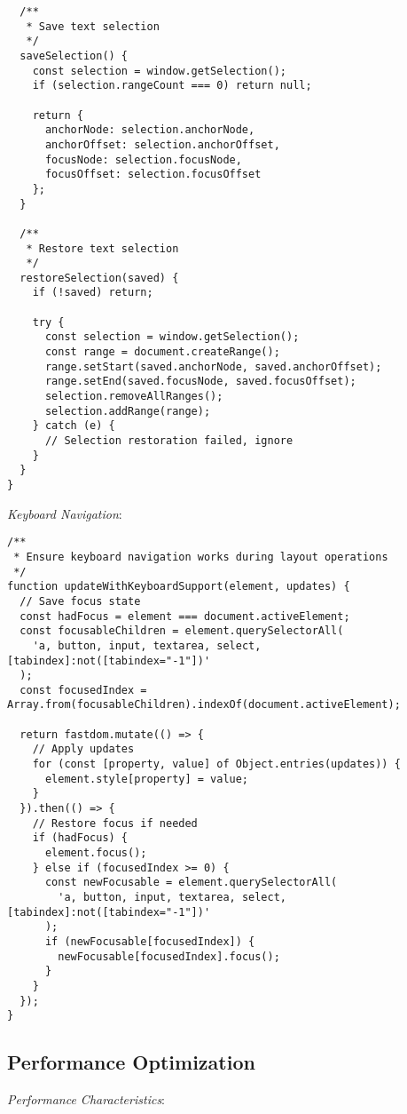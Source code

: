 \documentclass[11pt]{article}
\begin{document}
\begin{verbatim}
  /**
   * Save text selection
   */
  saveSelection() {
    const selection = window.getSelection();
    if (selection.rangeCount === 0) return null;
    
    return {
      anchorNode: selection.anchorNode,
      anchorOffset: selection.anchorOffset,
      focusNode: selection.focusNode,
      focusOffset: selection.focusOffset
    };
  }
  
  /**
   * Restore text selection
   */
  restoreSelection(saved) {
    if (!saved) return;
    
    try {
      const selection = window.getSelection();
      const range = document.createRange();
      range.setStart(saved.anchorNode, saved.anchorOffset);
      range.setEnd(saved.focusNode, saved.focusOffset);
      selection.removeAllRanges();
      selection.addRange(range);
    } catch (e) {
      // Selection restoration failed, ignore
    }
  }
}
\end{verbatim}

\emph{Keyboard Navigation}:

\begin{verbatim}
/**
 * Ensure keyboard navigation works during layout operations
 */
function updateWithKeyboardSupport(element, updates) {
  // Save focus state
  const hadFocus = element === document.activeElement;
  const focusableChildren = element.querySelectorAll(
    'a, button, input, textarea, select, [tabindex]:not([tabindex="-1"])'
  );
  const focusedIndex = Array.from(focusableChildren).indexOf(document.activeElement);
  
  return fastdom.mutate(() => {
    // Apply updates
    for (const [property, value] of Object.entries(updates)) {
      element.style[property] = value;
    }
  }).then(() => {
    // Restore focus if needed
    if (hadFocus) {
      element.focus();
    } else if (focusedIndex >= 0) {
      const newFocusable = element.querySelectorAll(
        'a, button, input, textarea, select, [tabindex]:not([tabindex="-1"])'
      );
      if (newFocusable[focusedIndex]) {
        newFocusable[focusedIndex].focus();
      }
    }
  });
}
\end{verbatim}
\subsection{Performance Optimization}
\label{sec:orgd7fc9ef}

\emph{Performance Characteristics}:
\end{document}

